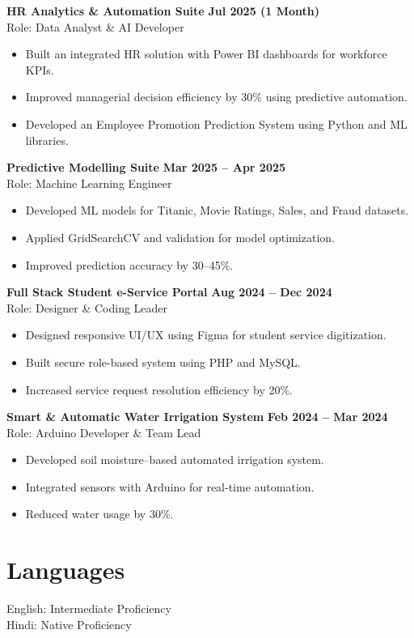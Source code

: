 \documentclass[11pt,a4paper]{article}
\begin{document}
\textbf{HR Analytics \& Automation Suite} \hfill \textbf{Jul 2025 (1 Month)} \\
Role: Data Analyst \& AI Developer
\begin{itemize}[leftmargin=*]
\item Built an integrated HR solution with Power BI dashboards for workforce KPIs.
\item Improved managerial decision efficiency by 30\% using predictive automation.
\item Developed an Employee Promotion Prediction System using Python and ML libraries.
\end{itemize}

\textbf{Predictive Modelling Suite} \hfill \textbf{Mar 2025 – Apr 2025} \\
Role: Machine Learning Engineer
\begin{itemize}[leftmargin=*]
\item Developed ML models for Titanic, Movie Ratings, Sales, and Fraud datasets.
\item Applied GridSearchCV and validation for model optimization.
\item Improved prediction accuracy by 30–45\%.
\end{itemize}

\textbf{Full Stack Student e-Service Portal} \hfill \textbf{Aug 2024 – Dec 2024} \\
Role: Designer \& Coding Leader
\begin{itemize}[leftmargin=*]
\item Designed responsive UI/UX using Figma for student service digitization.
\item Built secure role-based system using PHP and MySQL.
\item Increased service request resolution efficiency by 20\%.
\end{itemize}

\textbf{Smart \& Automatic Water Irrigation System} \hfill \textbf{Feb 2024 – Mar 2024} \\
Role: Arduino Developer \& Team Lead
\begin{itemize}[leftmargin=*]
\item Developed soil moisture–based automated irrigation system.
\item Integrated sensors with Arduino for real-time automation.
\item Reduced water usage by 30\%.
\end{itemize}

\section*{Languages}

English: Intermediate Proficiency \\
Hindi: Native Proficiency
\end{document}

